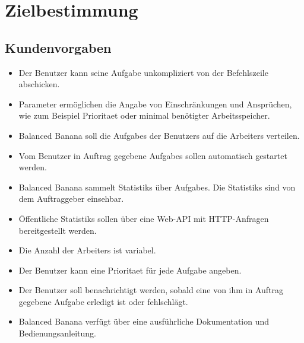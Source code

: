 \documentclass[a4paper,12pt]{article}
\begin{document}
\clearpage
\section{Zielbestimmung}
\subsection{Kundenvorgaben}
\begin{itemize}[nosep]
	
	\item Der \gls{Benutzer} kann seine \gls{Aufgabe} unkompliziert von der \gls{Befehlszeile} abschicken.
	
	\item \gls{Parameter} ermöglichen die Angabe von Einschränkungen und Ansprüchen, wie zum Beispiel \gls{Prioritaet} oder minimal benötigter Arbeitsspeicher.
		
	\item Balanced Banana soll die \glspl{Aufgabe} der \glspl{Benutzer} auf die \glspl{Arbeiter} verteilen.
	
	\item Vom \gls{Benutzer} in Auftrag gegebene \glspl{Aufgabe} sollen automatisch gestartet werden.
	
	\item Balanced Banana sammelt \glspl{Statistik} über \glspl{Aufgabe}. Die \glspl{Statistik} sind von dem Auftraggeber einsehbar.
	
	\item Öffentliche \glspl{Statistik} sollen über eine \gls{Web-API} mit HTTP-Anfragen bereitgestellt werden.
	
	\item Die Anzahl der \glspl{Arbeiter} ist variabel.
	
	\item Der \gls{Benutzer} kann eine \gls{Prioritaet} für jede \gls{Aufgabe} angeben.
	
	\item Der \gls{Benutzer} soll benachrichtigt werden, sobald eine von ihm in Auftrag gegebene \gls{Aufgabe} erledigt ist oder fehlschlägt.
	
	\item Balanced Banana verfügt über eine ausführliche Dokumentation und Bedienungsanleitung.

\end{itemize}
\end{document}
